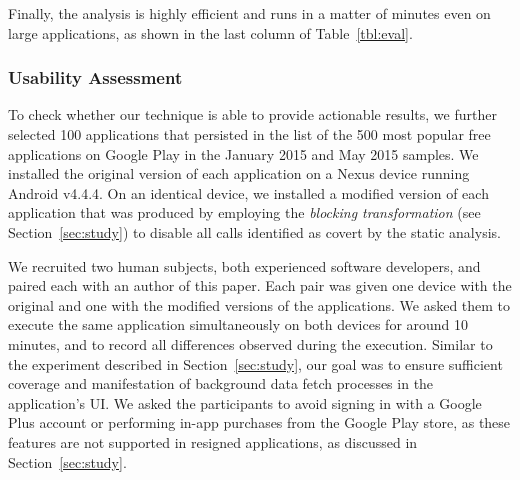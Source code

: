 Finally, the analysis is highly efficient and
runs in a matter of minutes even on large applications, as shown in
the last column of Table~\ref{tbl:eval}.






\subsubsection{Usability Assessment}
To check whether our technique is able to provide actionable results, we further selected 100 applications that persisted in the list of the 500 most popular free applications on Google Play in the January 2015 and May 2015 samples. 
We installed the original version of each application on a Nexus device running Android v4.4.4.
On an identical device, we installed a modified version of each application that was produced by employing the \emph{blocking transformation} (see Section~\ref{sec:study}) to disable all calls identified as covert by the static analysis. 

We recruited two human subjects, both experienced software developers, and paired each with an author of this paper.
Each pair was given one device with the original and one with the modified versions of the applications. We asked them to execute the same application simultaneously on both devices for around 10 minutes, and to record all differences observed during the execution.
Similar to the experiment described in Section~\ref{sec:study}, our goal was to ensure sufficient coverage and manifestation of background data fetch processes in the application's UI.
We asked the participants to avoid signing in with a Google Plus account or performing in-app purchases from the Google Play store, as these features are not supported in resigned applications, as discussed in Section~\ref{sec:study}.

